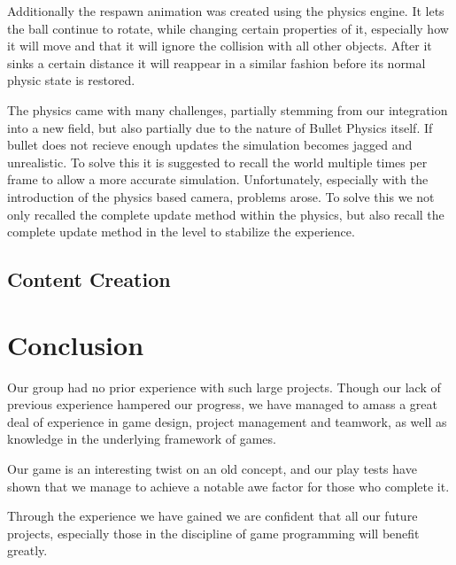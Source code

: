 \documentclass[sponsored]{acmsiggraph}
\begin{document}
Additionally the respawn animation was created using the physics engine. It lets the ball continue to rotate, while changing certain properties of it, especially how it will move and that it will ignore the collision with all other objects. After it sinks a certain distance it will reappear in a similar fashion before its normal physic state is restored.

The physics came with many challenges, partially stemming from our integration into a new field, but also partially due to the nature of Bullet Physics itself. If bullet does not recieve enough updates the simulation becomes jagged and unrealistic. To solve this it is suggested to recall the world multiple times per frame to allow a more accurate simulation. Unfortunately, especially with the introduction of the physics based camera, problems arose. To solve this we not only recalled the complete update method within the physics, but also recall the complete update method in the level to stabilize the experience.

\subsection{Content Creation}

\section{Conclusion}

Our group had no prior experience with such large projects. Though our lack of previous experience hampered our progress, we have managed to amass a great deal of experience in game design, project management and teamwork, as well as knowledge in the underlying framework of games.

Our game is an interesting twist on an old concept, and our play tests have shown that we manage to achieve a notable awe factor for those who complete it.

Through the experience we have gained we are confident that all our future projects, especially those in the discipline of game programming will benefit greatly.



%



\end{document}
